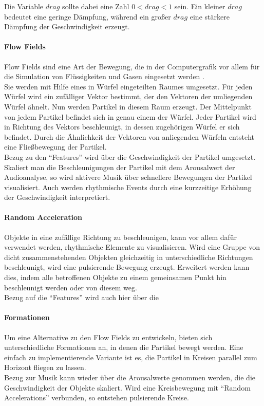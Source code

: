 \documentclass[11pt,a4paper]{article}
\begin{document}
\noindent
Die Variable $drag$ sollte dabei eine Zahl $0 < drag < 1$ sein. Ein kleiner $drag$ bedeutet eine geringe Dämpfung, während ein großer $drag$ eine stärkere Dämpfung der Geschwindigkeit erzeugt.

\paragraph{Flow Fields} Flow Fields sind eine Art der Bewegung, die in der Computergrafik vor allem für die Simulation von Flüssigkeiten und Gasen eingesetzt werden \cite{stam1999stable}.\\
Sie werden mit Hilfe eines in Würfel eingeteilten Raumes umgesetzt. Für jeden Würfel wird ein zufälliger Vektor bestimmt, der den Vektoren der umliegenden Würfel ähnelt. Nun werden Partikel in diesem Raum erzeugt. Der Mittelpunkt von jedem Partikel befindet sich in genau einem der Würfel. Jeder Partikel wird in Richtung des Vektors beschleunigt, in dessen zugehörigen Würfel er sich befindet. Durch die Ähnlichkeit der Vektoren von anliegenden Würfeln entsteht eine Fließbewegung der Partikel.\\
Bezug zu den ``Features'' wird über die Geschwindigkeit der Partikel umgesetzt. Skaliert man die Beschleunigungen der Partikel mit dem Arousalwert der Audioanalyse, so wird aktivere Musik über schnellere Bewegungen der Partikel visualisiert. Auch werden rhythmische Events durch eine kurzzeitige Erhöhung der Geschwindigkeit interpretiert.

\paragraph{Random Acceleration}
Objekte in eine zufällige Richtung zu beschleunigen, kann vor allem dafür verwendet werden, rhythmische Elemente zu visualisieren. Wird eine Gruppe von dicht zusammenstehenden Objekten gleichzeitig in unterschiedliche Richtungen beschleunigt, wird eine pulsierende Bewegung erzeugt. Erweitert werden kann dies, indem alle betroffenen Objekte zu einem gemeinsamen Punkt hin beschleunigt werden oder von diesem weg.\\
Bezug auf die ``Features'' wird auch hier über die 

\paragraph{Formationen}
Um eine Alternative zu den Flow Fields zu entwickeln, bieten sich unterschiedliche Formationen an, in denen die Partikel bewegt werden. Eine einfach zu implementierende Variante ist es, die Partikel in Kreisen parallel zum Horizont fliegen zu lassen.\\
Bezug zur Musik kann wieder über die Arousalwerte genommen werden, die die Geschwindigkeit der Objekte skaliert. Wird eine Kreisbewegung mit ``Random Accelerations'' verbunden, so entstehen pulsierende Kreise.
\end{document}
